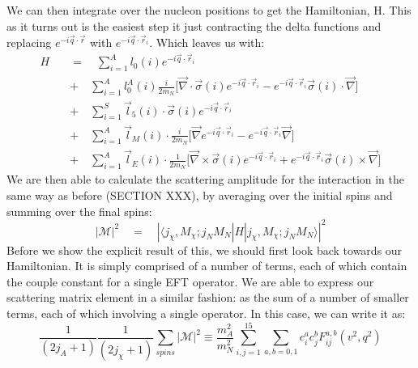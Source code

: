 \par
We can then integrate over the nucleon positions to get the Hamiltonian, H.
This as it turns out is the easiest step it just contracting the delta functions and replacing $e^{-i\vec{q}\cdot \vec{r}}$ with $e^{-i\vec{q}\cdot \vec{r}_i}$.
Which leaves us with:
\begin{equation}
\begin{split}
    H\quad & =\quad \sum^{A}_{i=1} l_{0}(i) e^{-i\vec{q}\cdot \vec{r}_i} \\
           & +\quad \sum^{A}_{i=1} l^A_0 (i) \frac{i}{2m_N} \Bigg[ \vec{\nabla} \cdot \vec{\sigma}(i) e^{-i\vec{q}\cdot \vec{r}_i} - e^{-i\vec{q}\cdot \vec{r}_i} \vec{\sigma}(i) \cdot \vec{\nabla} \Bigg] \\
           & +\quad \sum^{S}_{i=1} \vec{l}_5 (i) \cdot \vec{\sigma}(i) e^{-i\vec{q}\cdot \vec{r}_i} \\
           & +\quad \sum^{A}_{i=1} \vec{l}_M (i) \cdot \frac{i}{2m_N} \Bigg[ \vec{\nabla} e^{-i\vec{q}\cdot \vec{r}_i} - e^{-i\vec{q}\cdot \vec{r}_i}\vec{\nabla} \Bigg] \\
           & +\quad \sum^{A}_{i=1} \vec{l}_E (i) \cdot \frac{1}{2m_N} \Bigg[ \vec{\nabla} \times \vec{\sigma}(i)e^{-i\vec{q}\cdot \vec{r}_i} + e^{-i\vec{q}\cdot \vec{r}_i} \vec{\sigma}(i) \times \vec{\nabla} \Bigg]
\end{split}
\label{eq:eft_hamiltonian}
\end{equation}
We are then able to calculate the scattering amplitude for the interaction in the same way as before (SECTION XXX), by averaging over the initial spins and summing over the final spins:
\begin{equation}
    | \mathcal{M} |^2  \quad=\quad |\langle j_\chi,M_\chi;j_N M_N | H | j_\chi,M_\chi;j_N M_N \rangle |^2
\end{equation}
Before we show the explicit result of this, we should first look back towards our Hamiltonian.
It is simply comprised of a number of terms, each of which contain the couple constant for a single EFT operator.
We are able to express our scattering matrix element in a similar fashion: as the sum of a number of smaller terms, each of which involving a single operator.
In this case, we can write it as:
\begin{equation}
    \frac{1}{(2j_A + 1)}\frac{1}{(2j_\chi + 1)} \sum_{spins} |\mathcal{M}|^2 \equiv
    \frac{m_A^2}{m_N^2} \sum_{i,j=1}^{15} \sum_{a,b=0,1} c_i^{a}c_{j}^{b} F_{ij}^{a,b} (v^2,q^2)
    \label{eq:eft_scattering_amplitude_in_terms_of_operator_form_factors}
\end{equation}
